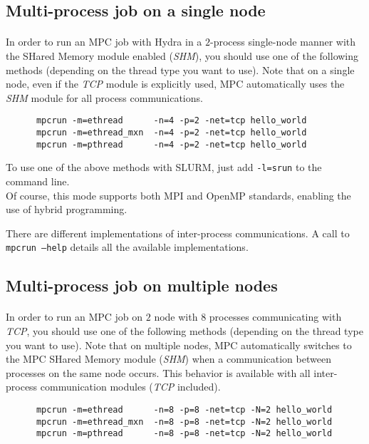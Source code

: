 \documentclass[a4paper,11pt]{article}
\begin{document}
\subsection{Multi-process job on a single node}
\paragraph{}
In order to run an MPC job with Hydra in a $2$-process single-node manner with the SHared Memory module enabled (\emph{SHM}),
you should use one of the following methods (depending on the thread type you want to use).
Note that on a single node, even if the \emph{TCP} module is explicitly used,
MPC automatically uses the \emph{SHM} module for all process communications.

\begin{lstlisting}
      mpcrun -m=ethread      -n=4 -p=2 -net=tcp hello_world
      mpcrun -m=ethread_mxn  -n=4 -p=2 -net=tcp hello_world
      mpcrun -m=pthread      -n=4 -p=2 -net=tcp hello_world
\end{lstlisting}
To use one of the above methods with SLURM, just add \texttt{-l=srun} to the
command line. \\

Of course, this mode supports both MPI and OpenMP standards, enabling the use of hybrid programming.

There are different implementations of inter-process communications.
A call to {\tt mpcrun --help} details all the available implementations.

\subsection{Multi-process job on multiple nodes}
\paragraph{}
In order to run an MPC job on $2$ node with $8$ processes communicating with
\emph{TCP}, you should use one of the following methods (depending on the thread
type you want to use). Note that on multiple nodes, MPC automatically switches
to the MPC SHared Memory module (\emph{SHM}) when a communication between
processes on the same node occurs. This behavior is available with all
inter-process communication modules (\emph{TCP} included).

\begin{lstlisting}
      mpcrun -m=ethread      -n=8 -p=8 -net=tcp -N=2 hello_world
      mpcrun -m=ethread_mxn  -n=8 -p=8 -net=tcp -N=2 hello_world
      mpcrun -m=pthread      -n=8 -p=8 -net=tcp -N=2 hello_world
\end{lstlisting}
\end{document}
